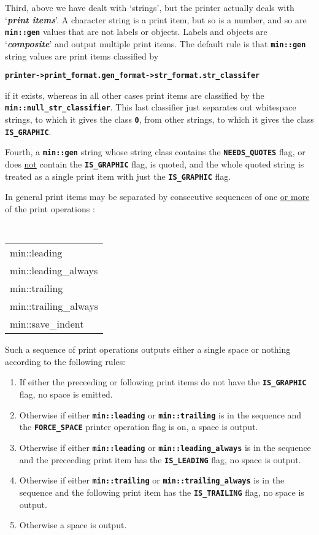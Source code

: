 \documentclass[12pt]{article}
\newcommand{\TT}[1]{{\tt \bfseries #1}}
\newcommand{\TTALL}{\tt \bfseries}
\newcommand{\key}[1]{{\bf \em #1}\index{#1}}
\newcommand{\ikey}[2]{{\bf \em #1}\index{#2}}
\newcommand{\EOL}{\penalty \exhyphenpenalty}
\begin{document}
Third, above we have dealt with `strings', but the printer actually
deals with
`\ikey{print items}{print item}'\label{PRINT-ITEM}.
A character string is a print item, but so is a number, and so are
\TT{min::gen} values that are not labels or objects.  Labels and
objects are `\key{composite}' and output multiple print items.
The default rule is that \TT{min::gen} string values are print
items classified by

\begin{center}
\TT{printer->print\_format.gen\_format->str\_format.str\_classifer}
\end{center}

if it exists, whereas in all other cases print items are classified by
the \TT{min::\EOL null\_\EOL str\_\EOL classifier}.
This last classifier just separates out whitespace strings, to which
it gives the class \TT{0}, from other strings, to which it gives
the class \TT{IS\_\EOL GRAPHIC}.

Fourth, a \TT{min::gen} string whose string class contains the
\TT{NEEDS\_\EOL QUOTES} flag, or does \underline{not}
contain the \TT{IS\_\EOL GRAPHIC} flag, is quoted,
and the whole quoted string is treated as a single print item with just the
\TT{IS\_\EOL GRAPHIC} flag.

In general print items may be separated by
consecutive sequences of one \underline{or more} of the print operations
\label{LEADING-TRAILING-RULES}:
\begin{center}
\TTALL
\begin{tabular}{l}
min::leading \\
min::leading\_always \\
min::trailing \\
min::trailing\_always \\
min::save\_indent \\
\end{tabular}
\end{center}
Such a sequence of print operations outputs either a single space or
nothing according to the following rules:
\begin{enumerate}
\item If either the preceeding or following print items do not have the
\TT{IS\_\EOL GRAPHIC} flag, no space is emitted.
\item Otherwise if either \TT{min::leading} or \TT{min::trailing}
is in the sequence and the \TT{FORCE\_\EOL SPACE} printer\label{FORCE_SPACE}
operation flag is on, a space is output.
\item Otherwise if either \TT{min::leading} or \TT{min::leading\_\EOL always}
is in the sequence and the preceeding print item has the \TT{IS\_\EOL LEADING}
flag, no space is output.
\item Otherwise if either \TT{min::trailing} or \TT{min::trailing\_\EOL always}
is in the sequence and the following print item has the \TT{IS\_\EOL TRAILING}
flag, no space is output.
\item Otherwise a space is output.
\end{enumerate}
\end{document}
